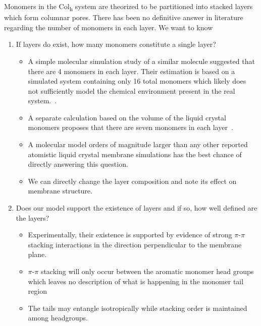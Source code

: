 \documentclass{article}
\begin{document}
  Monomers in the Col\textsubscript{h} system are theorized to be partitioned
  into stacked layers which form columnar pores. There has been no definitive
  answer in literature regarding the number of monomers in each layer. We want to
  know 
\begin{enumerate}
\item If layers do exist, how many monomers constitute a single layer? \label{point:monomernum}
  \begin{itemize}
    \item A simple molecular simulation study of a similar molecule suggested
    that there are 4 monomers in each layer. Their estimation is based on a
    simulated system containing only 16 total monomers which likely does not sufficiently
    model the chemical environment present in the real system.~\cite{zhu_methacrylated_2006}. 
    \item A separate calculation based on the volume of the liquid crystal monomers proposes
    that there are seven monomers in each layer~\cite{resel_structural_2000}. 
    \item A molecular model orders of magnitude larger than any other reported atomistic 
    liquid crystal membrane simulations has the best chance of directly answering this question.
    \item We can directly change the layer composition and note its effect on membrane structure.
  \end{itemize}

 \item Does our model support the existence of layers and if so, how well defined
  are the layers? \label{point:layers}
  \begin{itemize}
       \item Experimentally, their existence is supported by evidence of strong 
       $\pi$-$\pi$ stacking interactions in the direction perpendicular to the
       membrane plane.
       \item $\pi$-$\pi$ stacking will only occur between the aromatic monomer head groups which
       leaves no description of what is happening in the monomer tail region
       \item The tails may entangle isotropically while stacking order is maintained
       among headgroups. 
  \end{itemize}  
  

\end{enumerate}
\end{document}
